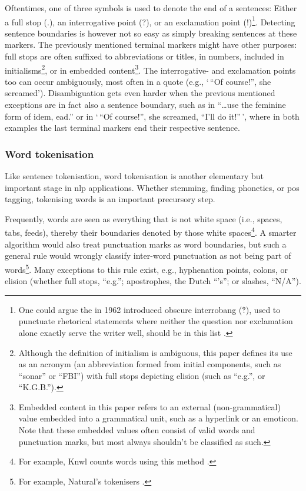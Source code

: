 \begin{enumerate}
Oftentimes, one of three symbols is used to denote the end of a
sentences: Either a full stop (.), an interrogative point (?), or an
exclamation point (!)\footnote{One could argue the in 1962 introduced
  obscure interrobang (‽), used to punctuate rhetorical statements where
  neither the question nor exclamation alone exactly serve the writer
  well, should be in this list \autocite{interrobang-mks.com}.}.
Detecting sentence boundaries is however not so easy as simply breaking
sentences at these markers. The previously mentioned terminal markers
might have other purposes: full stops are often suffixed to
abbreviations or titles, in numbers, included in initialisms\footnote{Although
  the definition of initialism is ambiguous, this paper defines its use
  as an acronym (an abbreviation formed from initial components, such as
  ``sonar'' or ``FBI'') with full stops depicting elision (such as
  ``e.g.'', or ``K.G.B.'').}, or in embedded content\footnote{Embedded
  content in this paper refers to an external (non-grammatical) value
  embedded into a grammatical unit, such as a hyperlink or an emoticon.
  Note that these embedded values often consist of valid words and
  punctuation marks, but most always shouldn't be classified as such.}.
The interrogative- and exclamation points too can occur ambiguously,
most often in a quote (e.g., `\,``Of course!'', she screamed').
Disambiguation gets even harder when the previous mentioned exceptions
are in fact also a sentence boundary, such as in ``\ldots{}use the
feminine form of idem, ead.'' or in `\,``Of course!'', she screamed,
``I'll do it!''\,', where in both examples the last terminal markers end
their respective sentence.

\subsubsection{Word tokenisation}\label{word-tokenisation}

Like sentence tokenisation, word tokenisation is another elementary but
important stage in \gls{nlp} applications. Whether stemming, finding
phonetics, or \gls{pos} tagging, tokenising words is an important
precursory step.

Frequently, words are seen as everything that is not white space (i.e.,
spaces, tabs, feeds), thereby their boundaries denoted by those white
spaces\footnote{For example, Knwl counts words using this method
  \autocite{loadfive/knwl-source-code}.}. A smarter algorithm would also
treat punctuation marks as word boundaries, but such a general rule
would wrongly classify inter-word punctuation as not being part of
words\footnote{For example, Natural's tokenisers
  \autocite{NaturalNode/natural-source-code}.}. Many exceptions to this
rule exist, e.g., hyphenation points, colons, or elision (whether full
stops, ``e.g.''; apostrophes, the Dutch ``'s''; or slashes, ``N\slash A'').


\end{enumerate}
